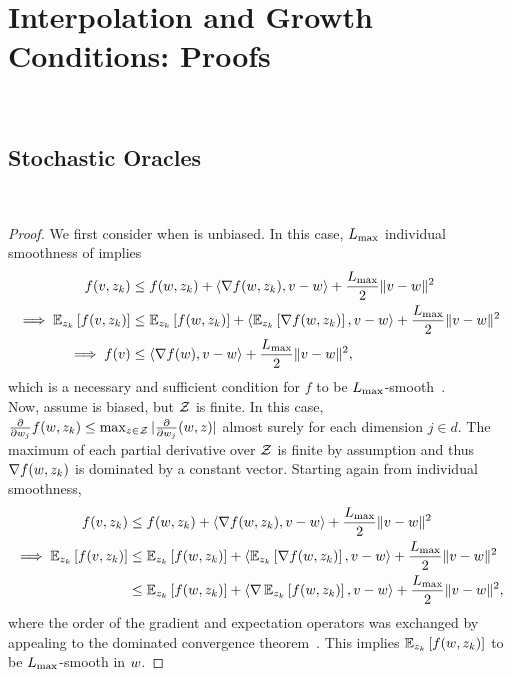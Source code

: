 
\chapter{Interpolation and Growth Conditions: Proofs}~\label{app:interpolation-gc}

\section{Stochastic Oracles}~\label{app:stochastic-oracles}

\indSmoothToSmooth*
\begin{proof}
    We first consider when \oracle{} is unbiased. In this case, \( L_{\text{max}} \) individual smoothness of \oracle{} implies
    \begin{align*}
        f(v, z_{k}) &\leq f(w, z_{k}) + \left\langle\nabla f(w, z_{k}), v - w\right\rangle + \frac{L_{\text{max}}}{2} \|v - w\|^2\\
        \implies \mathbb{E}_{z_{k}} \left[f(v, z_{k})\right] &\leq \mathbb{E}_{z_{k}} \left[f(w, z_{k})\right] + \left\langle\mathbb{E}_{z_{k}} \left[\nabla f(w, z_{k})\right], v - w\right\rangle + \frac{L_{\text{max}}}{2} \|v - w\|^2\\
        \implies f(v) &\leq \left\langle\nabla f(w), v - w\right\rangle + \frac{L_{\text{max}}}{2}\|v - w\|^2, 
    \end{align*}
    which is a necessary and sufficient condition for \( f \) to be \( L_{\text{max}} \)-smooth~\citep[Theorem 2.1.5]{nesterov2004lectures}.\\

    Now, assume \oracle{} is biased, but \( \mathcal{Z} \) is finite.
    In this case, \( \frac{\partial}{\partial w_j} f(w, z_{k}) \leq \max_{z \in \mathcal{Z}} | \frac{\partial}{\partial w_j} (w, z)| \) almost surely for each dimension \( j \in d \).
    The maximum of each partial derivative over \( \mathcal{Z} \) is finite by assumption and thus \( \nabla f(w, z_{k}) \) is dominated by a constant vector.
    Starting again from individual smoothness,
    \begin{align*}
        f(v, z_{k}) &\leq f(w, z_{k}) + \left\langle\nabla f(w, z_{k}), v - w\right\rangle + \frac{L_{\text{max}}}{2} \|v - w\|^2\\
        \implies \mathbb{E}_{z_{k}} \left[f(v, z_{k})\right] &\leq \mathbb{E}_{z_{k}} \left[f(w, z_{k})\right] + \left\langle\mathbb{E}_{z_{k}} \left[\nabla f(w, z_{k})\right], v - w\right\rangle + \frac{L_{\text{max}}}{2} \|v - w\|^2\\
                                     &\leq \mathbb{E}_{z_{k}} \left[f(w, z_{k})\right] + \left\langle\nabla \, \mathbb{E}_{z_{k}} \left[f(w, z_{k})\right], v - w\right\rangle + \frac{L_{\text{max}}}{2} \|v - w\|^2,
    \end{align*}
    where the order of the gradient and expectation operators was exchanged by appealing to the dominated convergence theorem~\citep[Theorem 4.16]{ccinlar2011probability}.
    This implies \( \mathbb{E}_{z_{k}}\left[f(w, z_{k})\right] \) to be \( L_{\text{max}} \)-smooth in \( w \).
\end{proof}

